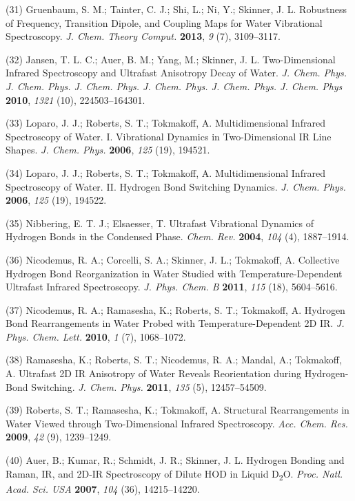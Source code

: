 \documentclass[]{article}
\begin{document}
(31) Gruenbaum, S. M.; Tainter, C. J.; Shi, L.; Ni, Y.; Skinner, J. L.
Robustness of Frequency, Transition Dipole, and Coupling Maps for Water
Vibrational Spectroscopy. \emph{J. Chem. Theory Comput.} \textbf{2013},
\emph{9} (7), 3109--3117.

(32) Jansen, T. L. C.; Auer, B. M.; Yang, M.; Skinner, J. L.
Two-Dimensional Infrared Spectroscopy and Ultrafast Anisotropy Decay of
Water. \emph{J. Chem. Phys. J. Chem. Phys. J. Chem. Phys. J. Chem. Phys.
J. Chem. Phys. J. Chem. Phys} \textbf{2010}, \emph{1321} (10),
224503--164301.

(33) Loparo, J. J.; Roberts, S. T.; Tokmakoff, A. Multidimensional
Infrared Spectroscopy of Water. I. Vibrational Dynamics in
Two-Dimensional IR Line Shapes. \emph{J. Chem. Phys.} \textbf{2006},
\emph{125} (19), 194521.

(34) Loparo, J. J.; Roberts, S. T.; Tokmakoff, A. Multidimensional
Infrared Spectroscopy of Water. II. Hydrogen Bond Switching Dynamics.
\emph{J. Chem. Phys.} \textbf{2006}, \emph{125} (19), 194522.

(35) Nibbering, E. T. J.; Elsaesser, T. Ultrafast Vibrational Dynamics
of Hydrogen Bonds in the Condensed Phase. \emph{Chem. Rev.}
\textbf{2004}, \emph{104} (4), 1887--1914.

(36) Nicodemus, R. A.; Corcelli, S. A.; Skinner, J. L.; Tokmakoff, A.
Collective Hydrogen Bond Reorganization in Water Studied with
Temperature-Dependent Ultrafast Infrared Spectroscopy. \emph{J. Phys.
Chem. B} \textbf{2011}, \emph{115} (18), 5604--5616.

(37) Nicodemus, R. A.; Ramasesha, K.; Roberts, S. T.; Tokmakoff, A.
Hydrogen Bond Rearrangements in Water Probed with Temperature-Dependent
2D IR. \emph{J. Phys. Chem. Lett.} \textbf{2010}, \emph{1} (7),
1068--1072.

(38) Ramasesha, K.; Roberts, S. T.; Nicodemus, R. A.; Mandal, A.;
Tokmakoff, A. Ultrafast 2D IR Anisotropy of Water Reveals Reorientation
during Hydrogen-Bond Switching. \emph{J. Chem. Phys.} \textbf{2011},
\emph{135} (5), 12457--54509.

(39) Roberts, S. T.; Ramasesha, K.; Tokmakoff, A. Structural
Rearrangements in Water Viewed through Two-Dimensional Infrared
Spectroscopy. \emph{Acc. Chem. Res.} \textbf{2009}, \emph{42} (9),
1239--1249.

(40) Auer, B.; Kumar, R.; Schmidt, J. R.; Skinner, J. L. Hydrogen
Bonding and Raman, IR, and 2D-IR Spectroscopy of Dilute HOD in Liquid
D\textsubscript{2}O. \emph{Proc. Natl. Acad. Sci. USA} \textbf{2007},
\emph{104} (36), 14215--14220.
\end{document}

